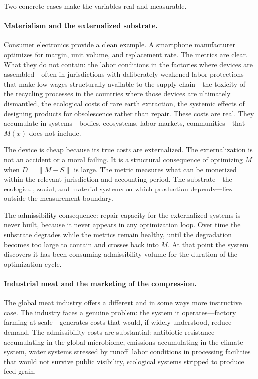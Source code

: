 \documentclass[11pt, letterpaper]{article}
\begin{document}
Two concrete cases make the variables real and measurable.

\paragraph{Materialism and the externalized substrate.} Consumer electronics provide a clean example. A smartphone manufacturer optimizes for margin, unit volume, and replacement rate. The metrics are clear. What they do not contain: the labor conditions in the factories where devices are assembled---often in jurisdictions with deliberately weakened labor protections that make low wages structurally available to the supply chain---the toxicity of the recycling processes in the countries where those devices are ultimately dismantled, the ecological costs of rare earth extraction, the systemic effects of designing products for obsolescence rather than repair. These costs are real. They accumulate in systems---bodies, ecosystems, labor markets, communities---that $M(x)$ does not include.

The device is cheap because its true costs are externalized. The externalization is not an accident or a moral failing. It is a structural consequence of optimizing $M$ when $D = \|M - S\|$ is large. The metric measures what can be monetized within the relevant jurisdiction and accounting period. The substrate---the ecological, social, and material systems on which production depends---lies outside the measurement boundary.

The admissibility consequence: repair capacity for the externalized systems is never built, because it never appears in any optimization loop. Over time the substrate degrades while the metrics remain healthy, until the degradation becomes too large to contain and crosses back into $M$. At that point the system discovers it has been consuming admissibility volume for the duration of the optimization cycle.

\paragraph{Industrial meat and the marketing of the compression.} The global meat industry offers a different and in some ways more instructive case. The industry faces a genuine problem: the system it operates---factory farming at scale---generates costs that would, if widely understood, reduce demand. The admissibility costs are substantial: antibiotic resistance accumulating in the global microbiome, emissions accumulating in the climate system, water systems stressed by runoff, labor conditions in processing facilities that would not survive public visibility, ecological systems stripped to produce feed grain.
\end{document}
